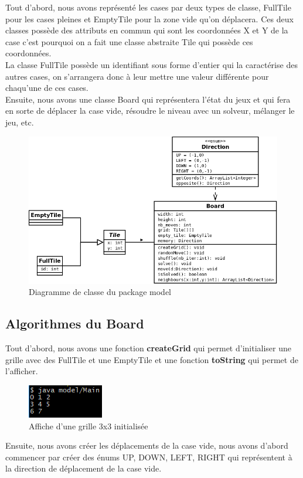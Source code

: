 \documentclass[a4paper,12pt]{article} %
\begin{document}
Tout d'abord, nous avons représenté les cases par deux types de classe, FullTile pour les cases pleines et EmptyTile pour la zone vide qu'on déplacera. Ces deux classes possède des attributs en commun qui sont les coordonnées X et Y de la case c'est pourquoi on a fait une classe abstraite Tile qui possède ces coordonnées.\\
La classe FullTile possède un identifiant sous forme d'entier qui la caractérise des autres cases, on s'arrangera donc à leur mettre une valeur différente pour chaqu'une de ces cases.\\

Ensuite, nous avons une classe Board qui représentera l'état du jeux et qui fera en sorte de déplacer la case vide, résoudre le niveau avec un solveur, mélanger le jeu, etc.

\begin{figure}[!h]
\centering
\includegraphics[scale=0.4]{images/model.png}
\caption{Diagramme de classe du package model}
\end{figure}

\newpage

\subsection{Algorithmes du Board}

Tout d'abord, nous avons une fonction \textbf{createGrid} qui permet d'initialiser une grille avec des FullTile et une EmptyTile et une fonction \textbf{toString} qui permet de l'afficher.

\begin{figure}[!h]
\centering
\includegraphics[scale=1]{images/Capture2.PNG}
\caption{Affiche d'une grille 3x3 initialisée}
\end{figure}

Ensuite, nous avons créer les déplacements de la case vide, nous avons d'abord commencer par créer des énums UP, DOWN, LEFT, RIGHT qui représentent à la direction de déplacement de la case vide.
\end{document}
